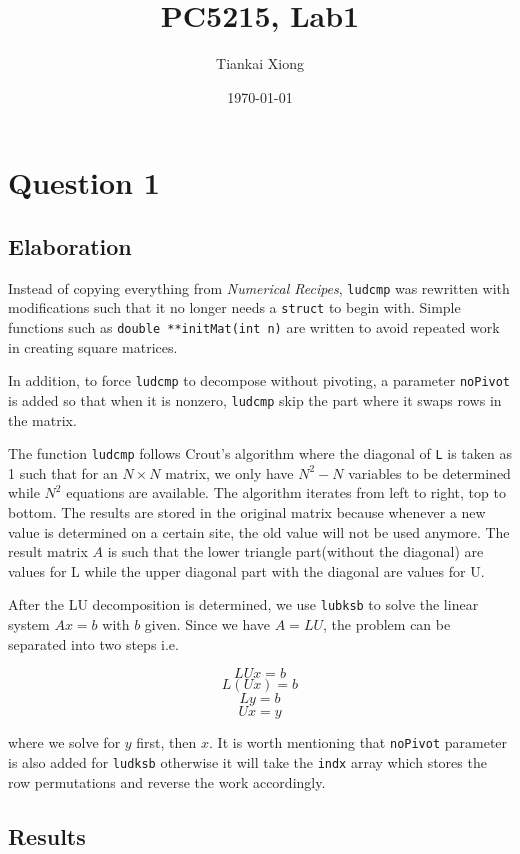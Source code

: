 \documentclass{article}
\author{Tiankai Xiong}
\date{\today}
\title{PC5215, Lab1}
\begin{document}
\maketitle


\section{Question 1}
\label{sec-1}

\subsection{Elaboration}
\label{sec-1-1}

Instead of copying everything from \emph{Numerical Recipes},
\texttt{ludcmp} was rewritten with modifications such that it no
longer needs a \texttt{struct} to begin with. Simple functions such
as \texttt{double **initMat(int n)} are written to avoid repeated
work in creating square matrices.

In addition, to force \texttt{ludcmp} to decompose without pivoting, a
parameter \texttt{noPivot} is added so that when it is nonzero, \texttt{ludcmp} skip
the part where it swaps rows in the matrix.

The function \texttt{ludcmp} follows Crout's algorithm where the diagonal of
\texttt{L} is taken as 1 such that for an $N \times N$ matrix, we only have
$N^2 - N$ variables to be determined while $N^2$ equations are
available. The algorithm iterates from left to right, top to
bottom. The results are stored in the original matrix because
whenever a new value is determined on a certain site, the old value
will not be used anymore. The result matrix $A$ is such that the
lower triangle part(without the diagonal) are values for L while
the upper diagonal part with the diagonal are values for U.

After the LU decomposition is determined, we use \texttt{lubksb} to solve
the linear system $Ax = b$ with $b$ given. Since we have $A = LU$,
the problem can be separated into two steps i.e.

$$L U x = b$$
$$L (U x) = b$$
$$L y = b$$
$$U x = y$$

where we solve for $y$ first, then $x$. It is worth mentioning that
\texttt{noPivot} parameter is also added for \texttt{ludksb} otherwise it will take
the \texttt{indx} array which stores the row permutations and reverse the
work accordingly.

\subsection{Results}
\label{sec-1-2}
\end{document}
